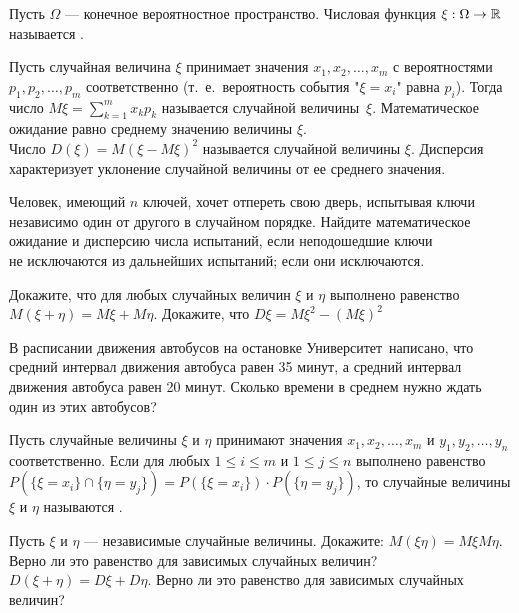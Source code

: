 \documentclass[a4paper,12pt]{article}
\begin{document}



Пусть $\Omega $ --- конечное вероятностное пространство. Числовая функция
$\xi:\Omega\to {\Bbb R}$ называется .

Пусть случайная величина $\xi$ принимает значения $x_1,x_2,\dots ,x_m$ с
вероятностями $p_1,p_2,\dots ,p_m$ соответственно (т.~е.~вероятность события
"$\xi =x_i$" равна $p_i$). Тогда число $M\xi = \sum\limits_{k=1}^{m}x_k
p_k$ называется  случайной величины~$\xi$.
Математическое ожидание равно среднему значению величины $\xi$.\\
Число $D(\xi)=M(\xi - M\xi)^2$ называется  случайной величины
$\xi $. Дисперсия  характеризует уклонение случайной величины от ее среднего
значения.

Человек, имеющий $n$ ключей, хочет отпереть свою дверь, испытывая
ключи независимо один
от другого в случайном порядке. Найдите математическое
ожидание и дисперсию числа испытаний, если неподошедшие ключи\\
 не исключаются из дальнейших испытаний;
 если они исключаются.

 Докажите, что для любых случайных величин $\xi $ и $\eta $ выполнено
равенство $M(\xi +\eta )=M\xi + M\eta$.
 Докажите, что $D\xi = M\xi ^2 - (M\xi )^2$

В расписании движения автобусов на остановке
 Университет\ написано, что
средний интервал движения автобуса  равен 35 минут, а средний интервал
движения автобуса  равен 20 минут. Сколько времени в среднем нужно
ждать один из этих автобусов?




Пусть случайные величины $\xi$ и $\eta$ принимают значения $x_1,x_2,\dots ,x_m$
и  $y_1,y_2,\dots ,y_n$ соответственно. Если для любых $1\le i\le m$ и  $1\le
j\le n$ выполнено равенство
$P(\{\xi=x_i\} \cap \{\eta=y_j\})=P(\{\xi=x_i\})\cdot
P(\{\eta =y_j \})$, то случайные величины
$\xi$ и $\eta$ называются .


Пусть $\xi$ и $\eta$ --- независимые случайные величины. Докажите:
 $M(\xi \eta)=M\xi M\eta$.
Верно ли это равенство для зависимых случайных величин?
 $D(\xi + \eta)=D\xi + D\eta$.
Верно ли это равенство для зависимых случайных величин?
\end{document}
